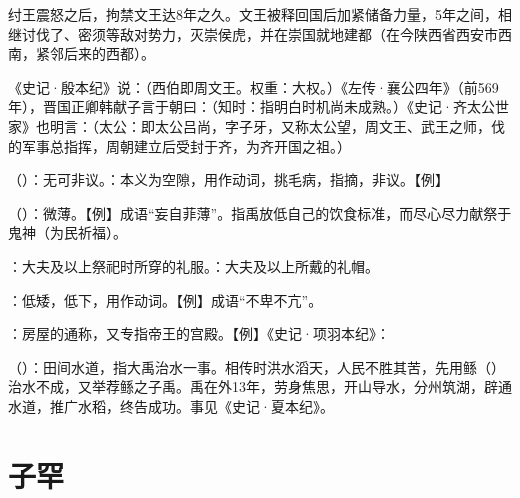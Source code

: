 {\begin{lyenumerate}
\item 纣王震怒之后，拘禁文王达8年之久。文王被释回国后加紧储备力量，5年之间，相继讨伐了、密须等敌对势力，灭崇侯虎，并在崇国就地建都（在今陕西省西安市西南，紧邻后来的西都）。

\item 《史记·殷本纪》说：（西伯即周文王。权重：大权。）《左传·襄公四年》（前569年），晋国正卿韩献子言于朝曰：（知时：指明白时机尚未成熟。）《史记·齐太公世家》也明言：（太公：即太公吕尚，字子牙，又称太公望，周文王、武王之师，伐的军事总指挥，周朝建立后受封于齐，为齐开国之祖。）
\end{lyenumerate}
}
{}


{
\item {}（）：无可非议。：本义为空隙，用作动词，挑毛病，指摘，非议。【例】 
\item {}（）：微薄。【例】成语“妄自菲薄”。指禹放低自己的饮食标准，而尽心尽力献祭于鬼神（为民祈福）。

\item {}：大夫及以上祭祀时所穿的礼服。：大夫及以上所戴的礼帽。
\item {}：低矮，低下，用作动词。【例】成语“不卑不亢”。
\item {}：房屋的通称，又专指帝王的宫殿。【例】《史记·项羽本纪》：

\item {}（）：田间水道，指大禹治水一事。相传时洪水滔天，人民不胜其苦，先用鲧（）治水不成，又举荐鲧之子禹。禹在外13年，劳身焦思，开山导水，分州筑湖，辟通水道，推广水稻，终告成功。事见《史记·夏本纪》。
}
{}



\chapter{子罕}

